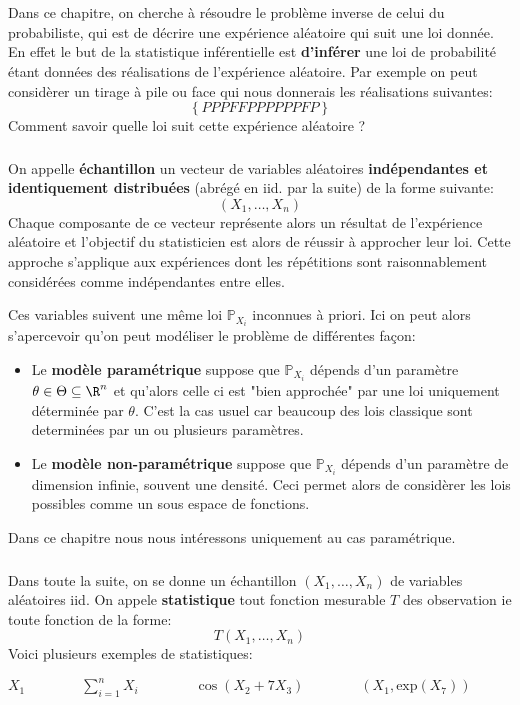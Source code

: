\chapter*{}

Dans ce chapitre, on cherche à résoudre le problème inverse de celui du probabiliste, qui est de décrire une expérience aléatoire qui suit une loi donnée. En effet le but de la statistique inférentielle est \textbf{d'inférer} une loi de probabilité étant données des réalisations de l'expérience aléatoire. Par exemple on peut considèrer un tirage à pile ou face qui nous donnerais les réalisations suivantes:
\[ 
   \left\{ PPPFFPPPPPPFP \right\}  
\]
Comment savoir quelle loi suit cette expérience aléatoire ?
\subsection*{}
On appelle \textbf{échantillon} un vecteur de variables aléatoires \textbf{indépendantes et identiquement distribuées} (abrégé en iid. par la suite) de la forme suivante:
\[ 
   (X_1, \ldots, X_n) 
\] 
Chaque composante de ce vecteur représente alors un résultat de l'expérience aléatoire et l'objectif du statisticien est alors de réussir à approcher leur loi. Cette approche s'applique aux expériences dont les répétitions sont raisonnablement considérées comme indépendantes entre elles.\<

Ces variables suivent une même loi \( \mathbb{P}_{X_{i}} \) inconnues à priori. Ici on peut alors s'apercevoir qu'on peut modéliser le problème de différentes façon:
\begin{itemize}
   \item Le \textbf{modèle paramétrique} suppose que \( \mathbb{P}_{X_{i}} \) dépends d'un paramètre \( \theta \in \Theta \subseteq \R^n \) et qu'alors celle ci est "bien approchée" par une loi uniquement déterminée par \( \theta \). C'est la cas usuel car beaucoup des lois classique sont determinées par un ou plusieurs paramètres.
   \item Le \textbf{modèle non-paramétrique} suppose que \( \mathbb{P}_{X_{i}} \) dépends d'un paramètre de dimension infinie, souvent une densité. Ceci permet alors de considèrer les lois possibles comme un sous espace de fonctions.
\end{itemize}
Dans ce chapitre nous nous intéressons uniquement au cas paramétrique.
\subsection*{}
Dans toute la suite, on se donne un échantillon \( (X_1, \ldots, X_n) \) de variables aléatoires iid. On appele \textbf{statistique} tout fonction mesurable \( T \) des observation ie toute fonction de la forme:
\[ 
   T(X_1, \ldots, X_n) 
\]
Voici plusieurs exemples de statistiques:
\begin{center}
   \(X_1 \quad\quad\quad\quad \sum_{i = 1}^n X_i \quad\quad\quad\quad \cos(X_2 + 7X_3) \quad\quad\quad\quad (X_1, \text{exp}(X_7))\) 
\end{center}
